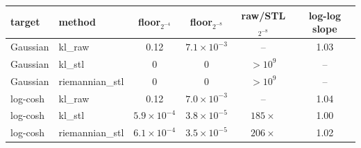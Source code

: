 \begin{tabular}{ll ccc c}
\toprule
target & method & floor$_{2^{-4}}$ & floor$_{2^{-8}}$ & raw/STL$_{2^{-8}}$ & log-log slope \\
\midrule
Gaussian & kl\_raw & 0.12 & $7.1\times10^{-3}$ & -- & 1.03 \\
Gaussian & kl\_stl & 0 & 0 & $>\!10^{9}$ & -- \\
Gaussian & riemannian\_stl & 0 & 0 & $>\!10^{9}$ & -- \\
log-cosh & kl\_raw & 0.12 & $7.0\times10^{-3}$ & -- & 1.04 \\
log-cosh & kl\_stl & $5.9\times10^{-4}$ & $3.8\times10^{-5}$ & $185\times$ & 1.00 \\
log-cosh & riemannian\_stl & $6.1\times10^{-4}$ & $3.5\times10^{-5}$ & $206\times$ & 1.02 \\
\bottomrule
\end{tabular}
